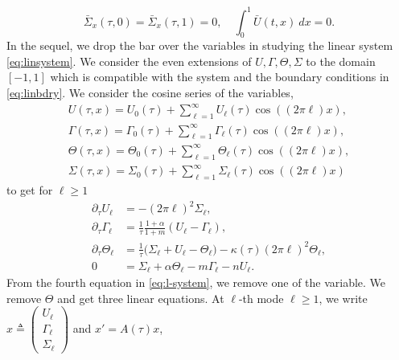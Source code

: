 \documentclass[a4paper,11pt]{article}
\def\l{(2\pi \ell)}
\theoremstyle{remark}
\begin{document}
\begin{equation} \label{eq:linbdry}
 \bar\Sigma_{x}(\tau,0)=\bar\Sigma_{x}(\tau,1)=0, \quad \int_0^1 \bar U(t,x) \: dx = 0.
\end{equation}
In the sequel, we drop the bar over the variables in studying the linear system \eqref{eq:linsystem}. 
We consider the even extensions of $U,\Gamma,\Theta,\Sigma$ to the domain $[-1,1]$ which is compatible with the system and the boundary conditions in \eqref{eq:linbdry}. We consider the cosine series of the variables,
\begin{align*}
 U(\tau,x) = U_0(\tau) + \sum_{\ell=1}^\infty U_\ell(\tau)\cos(\l x),\\
 \Gamma(\tau,x) = \Gamma_0(\tau) + \sum_{\ell=1}^\infty \Gamma_\ell(\tau)\cos(\l x),\\
 \Theta(\tau,x) = \Theta_0(\tau) + \sum_{\ell=1}^\infty \Theta_\ell(\tau)\cos(\l x),\\
 \Sigma(\tau,x) = \Sigma_0(\tau) + \sum_{\ell=1}^\infty \Sigma_\ell(\tau)\cos(\l x)
\end{align*}
to get for $\ell\ge1$
\begin{equation} \label{eq:l-system}
 \begin{aligned}
  \partial_\tau U_\ell &= -\l^2 \Sigma_\ell,\\
  \partial_\tau\Gamma_\ell &= \frac{1}{\tau}\frac{1+\alpha}{1+m}(U_\ell-\Gamma_\ell),\\
  \partial_\tau\Theta_\ell &= \frac{1}{\tau}\Big(\Sigma_\ell+ U_\ell -\Theta_\ell\Big) - \kappa(\tau)\l^2\Theta_\ell,\\
  0&=\Sigma_\ell + \alpha\Theta_\ell -m\Gamma_\ell - nU_\ell .
 \end{aligned}
\end{equation}
From the fourth equation in \eqref{eq:l-system}, we remove one of the variable. We remove $\Theta$ and get three linear equations. At $\ell$-th mode $\ell\ge1$, we write $x\triangleq\begin{pmatrix}
   U_\ell \\ \Gamma_\ell \\ \Sigma_\ell
  \end{pmatrix}$ and $x'=A(\tau)x$,
\end{document}
